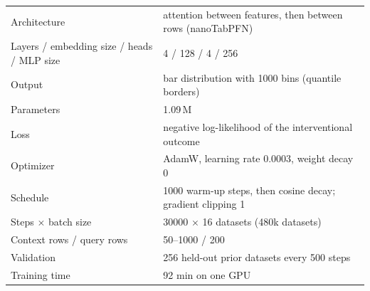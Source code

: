 \begin{tabular}{ll}
\toprule
Architecture & attention between features, then between rows (nanoTabPFN) \\
Layers / embedding size / heads / MLP size & 4 / 128 / 4 / 256 \\
Output & bar distribution with 1000 bins (quantile borders) \\
Parameters & 1.09\,M \\
Loss & negative log-likelihood of the interventional outcome \\
Optimizer & AdamW, learning rate 0.0003, weight decay 0 \\
Schedule & 1000 warm-up steps, then cosine decay; gradient clipping 1 \\
Steps $\times$ batch size & 30000 $\times$ 16 datasets (480k datasets) \\
Context rows / query rows & 50--1000 / 200 \\
Validation & 256 held-out prior datasets every 500 steps \\
Training time & 92 min on one GPU \\
\bottomrule
\end{tabular}
